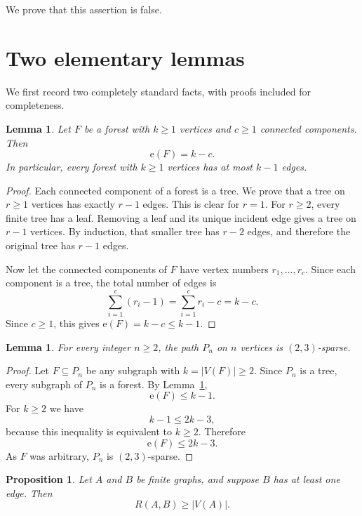\documentclass[11pt]{amsart}
\newtheorem{lemma}[theorem]{Lemma}
\newtheorem{proposition}[theorem]{Proposition}
\theoremstyle{remark}
\newcommand{\edg}{\mathrm e}
\begin{document}
We prove that this assertion is false.

\section{Two elementary lemmas}

We first record two completely standard facts, with proofs included for completeness.

\begin{lemma}\label{lem:forest-edge-count}
Let $F$ be a forest with $k\ge 1$ vertices and $c\ge 1$ connected components.  Then
\[
        \edg(F)=k-c.
\]
In particular, every forest with $k\ge 1$ vertices has at most $k-1$ edges.
\end{lemma}

\begin{proof}
Each connected component of a forest is a tree.  We prove that a tree on $r\ge 1$ vertices has exactly $r-1$ edges.  This is clear for $r=1$.  For $r\ge 2$, every finite tree has a leaf.  Removing a leaf and its unique incident edge gives a tree on $r-1$ vertices.  By induction, that smaller tree has $r-2$ edges, and therefore the original tree has $r-1$ edges.

Now let the connected components of $F$ have vertex numbers $r_1,\ldots,r_c$.  Since each component is a tree, the total number of edges is
\[
        \sum_{i=1}^c (r_i-1)
        =\sum_{i=1}^c r_i-c
        =k-c.
\]
Since $c\ge 1$, this gives $\edg(F)=k-c\le k-1$.
\end{proof}

\begin{lemma}\label{lem:paths-sparse}
For every integer $n\ge 2$, the path $P_n$ on $n$ vertices is $(2,3)$-sparse.
\end{lemma}

\begin{proof}
Let $F\subseteq P_n$ be any subgraph with $k=|V(F)|\ge 2$.  Since $P_n$ is a tree, every subgraph of $P_n$ is a forest.  By Lemma~\ref{lem:forest-edge-count},
\[
        \edg(F)\le k-1.
\]
For $k\ge 2$ we have
\[
        k-1\le 2k-3,
\]
because this inequality is equivalent to $k\ge 2$.  Therefore
\[
        \edg(F)\le 2k-3.
\]
As $F$ was arbitrary, $P_n$ is $(2,3)$-sparse.
\end{proof}

\begin{proposition}\label{prop:trivial-lower-bound}
Let $A$ and $B$ be finite graphs, and suppose $B$ has at least one edge.  Then
\[
        R(A,B)\ge |V(A)|.
\]
\end{proposition}
\end{document}
